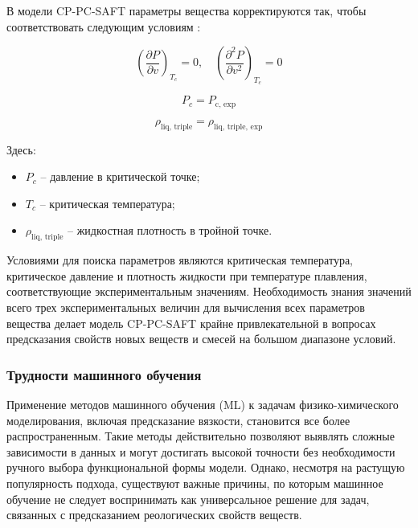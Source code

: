 \documentclass[a4paper,12pt]{article}
\begin{document}
В модели CP-PC-SAFT параметры вещества корректируются так, чтобы соответствовать следующим условиям \cite{polishuk2014standardized}:

\begin{equation}
\left( \frac{\partial P}{\partial v} \right)_{T_c} = 0, \quad
\left( \frac{\partial^2 P}{\partial v^2} \right)_{T_c} = 0
\end{equation}

\begin{equation}
P_c = P_{\text{c, exp}}
\end{equation}

\begin{equation}
\rho_{\text{liq, triple}} = \rho_{\text{liq, triple, exp}}
\end{equation}

Здесь:
\begin{itemize}
    \item \( P_c \) -- давление в критической точке;
    \item \( T_c \) -- критическая температура;
    \item \( \rho_{\text{liq, triple}} \) -- жидкостная плотность в тройной точке.
\end{itemize}

Условиями для поиска параметров являются критическая температура, критическое давление и плотность жидкости при температуре плавления, соответствующие экспериментальным значениям. Необходимость знания значений всего трех экспериментальных величин для вычисления всех параметров вещества делает модель CP-PC-SAFT крайне привлекательной в вопросах предсказания свойств новых веществ и смесей на большом диапазоне условий. 

    \subsubsection{Трудности машинного обучения}

      Применение методов машинного обучения (ML) к задачам физико-химического моделирования, включая предсказание вязкости, становится все более распространенным. Такие методы действительно позволяют выявлять сложные зависимости в данных и могут достигать высокой точности без необходимости ручного выбора функциональной формы модели. Однако, несмотря на растущую популярность подхода, существуют важные причины, по которым машинное обучение не следует воспринимать как универсальное решение для задач, связанных с предсказанием реологических свойств веществ.
\end{document}
